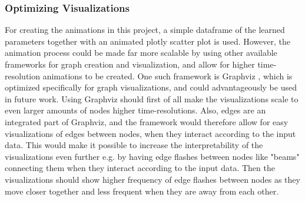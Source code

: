 \subsubsection{Optimizing Visualizations}
For creating the animations in this project, a simple dataframe of the learned parameters together with an animated plotly \cite{PlotlyPlotly} scatter plot is used. 
However, the animation process could be made far more scalable by using other available frameworks for graph creation and visualization, and allow for higher time-resolution animations to be created. 
One such framework is Graphviz \cite{Graphviz}, which is optimized specifically for graph visualizations, and could advantageously be used in future work. 
Using Graphviz should first of all make the visualizations scale to even larger amounts of nodes higher time-resolutions. 
Also, edges are an integrated part of Graphviz, and the framework would therefore allow for easy visualizations of edges between nodes, when they interact according to the input data. This would make it possible to increase the interpretability of the visualizations even further e.g. by having edge flashes between nodes like "beams" connecting them when they interact according to the input data. Then the visualizations should show higher frequency of edge flashes between nodes as they move closer together and less frequent when they are away from each other.